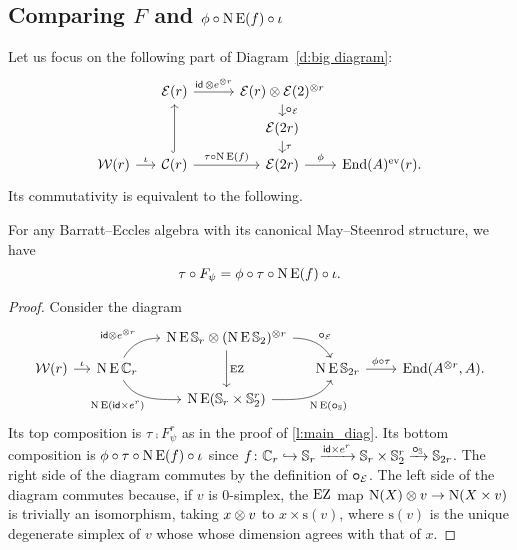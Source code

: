 \subsection{Comparing $F$ and $\phi \mathbin{\circ} \operatorname{N}\operatorname{E}(f) \mathbin{\circ} \iota$}

Let us focus on the following part of Diagram~\eqref{d:big diagram}:
\[
\begin{tikzcd}[row sep=small]
	&[-10pt]\BE(r) \arrow[r,"\id \, \ot e^{\ot r}"] &[5pt]
	\BE(r) \ot \BE(2)^{\ot r} \arrow[d,"\bcomp_{\BE}"] &[-20pt] \\ &
	&\BE(2r) \arrow[d, "\tau"] & \\
	\cW(r) \arrow[r,"\iota"] &
	\cC(r) \arrow[uu,hook] \arrow[r,"\tau \comp \chains\EE(f)"] &
	\BE(2r) \arrow[r,"\phi"] & \End(A)^\ev(r).
\end{tikzcd}
\]
Its commutativity is equivalent to the following.

\begin{lemma}\label{l:K0}
	For any Barratt--Eccles algebra with its canonical May--Steenrod structure, we have
	\[
	\tau \mathbin{\circ} F_\psi = \phi \mathbin{\circ} \tau \mathbin{\circ} \operatorname{N}\operatorname{E}(f) \mathbin{\circ} \iota.
	\]
\end{lemma}

\begin{proof}
	Consider the diagram
	\[\label{d:F and f}
		\begin{tikzcd}[column sep=small,row sep=tiny]
			&& \chains\EE\sym_r \ot (\chains\EE\sym_2)^{\ot r}
			\arrow[dr,"\bcomp_{\BE}",out=0,in=120]
			\arrow[dd,"\EZ"] &&[10pt] \\
			\cW(r) \arrow[r,"\iota"] &
			\chains\EE\cyc_r
			\arrow[ur,"\id \ot e^{\ot r}", out=60,in=180]
			\arrow[dr,"\chains\EE(\id \times e^r)"',out=-60,in=180]
			& & \chains\EE\sym_{2r} \arrow[r,"\phi\comp\tau"] &
			\End(A^{\ot r}, A). \\
			&& \chains\EE(\sym_r \times \sym_2^r)
			\arrow[ur, "\chains\EE(\bcomp_{\sym})"', out=0,in=-120]
			&
		\end{tikzcd}
	\]
	Its top composition is $\tau \comp F_\psi^r$ as in the proof of \cref{l:main_diag}.
	Its bottom composition is $\phi \mathbin{\circ} \tau \mathbin{\circ} \operatorname{N}\operatorname{E}(f) \mathbin{\circ} \iota$ since $f \colon \mathbb{C}_r \hookrightarrow \mathbb{S}_r \xrightarrow{\mathsf{id} \times e^r} \mathbb{S}_r \times \mathbb{S}_2^r \xrightarrow{\bm{\mathbin{\circ}}_{\mathbb{S}}} \mathbb{S}_{2r}$.
	The right side of the diagram commutes by the definition of $\bm{\mathbin{\circ}}_{\mathcal{E}}$.
	The left side of the diagram commutes because, if $v$ is $0$-simplex, the $\operatorname{EZ}$ map $\operatorname{N}(X) \otimes v \to \operatorname{N}(X \times v)$ is trivially an isomorphism, taking $x \otimes v$ to $x \times \mathrm{s}(v)$, where $\mathrm{s}(v)$ is the unique degenerate simplex of $v$ whose whose dimension agrees with that of $x$.
\end{proof}


